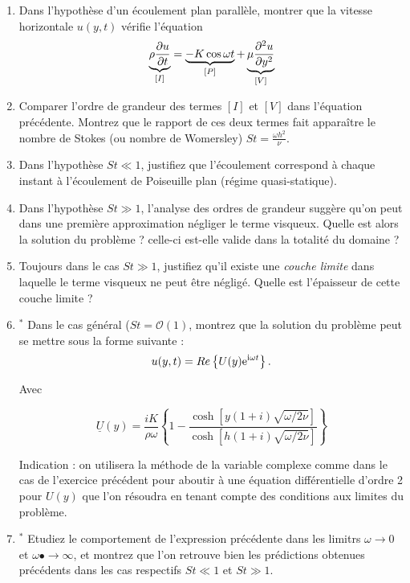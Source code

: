 \begin{enumerate}
\item 
Dans l'hypoth\`ese d'un \'ecoulement plan parall\`ele, montrer que
la vitesse horizontale $u(y, t)$ v\'erifie l'\'equation
\begin{equation}
\underbrace{\rho \frac {\partial u} {\partial t}}_{[I]} = \underbrace{- K \cos \omega t}_{[P]} + \underbrace{\mu \frac {\partial^{2} u} {\partial y ^{2}}}_{[V]}
\label{eq:ns}
\end{equation}

\item Comparer l'ordre de grandeur des termes $[I]$ et $[V]$ dans l'équation précédente. Montrez que le rapport de ces deux termes fait apparaître 
le nombre de Stokes (ou nombre de Womersley) $St = \frac{\omega h^2  }{\nu}$.

\item Dans l'hypothèse $St \ll 1$, justifiez que l'écoulement correspond à chaque instant à l'écoulement de Poiseuille plan   
(régime quasi-statique).

\item Dans l'hypothèse $St \gg 1$, l'analyse des ordres de grandeur suggère qu'on peut dans une première approximation
négliger le terme visqueux. Quelle est alors la solution du problème ? celle-ci est-elle valide dans la totalité du domaine ?

\item Toujours dans le cas  $St \gg 1$, justifiez qu'il existe une {\em couche limite} dans laquelle le terme visqueux ne peut être négligé. 
Quelle est l'épaisseur de cette couche limite ?

\item $^*$ Dans le cas général ($St = {\mathcal O}(1)$, montrez que la solution du problème peut se mettre sous la forme suivante :
$$u(y, t) = Re \left \{ U(y) \mathrm{e}^{\mathrm{i} \omega t} \right \}.$$

Avec 

\begin{equation}
\label{sol}
 \underline{U}(y) = \frac{iK}{\rho \omega} \left \{ 
1 - \frac{\cosh [ y ( 1+i) \sqrt{\omega / 2\nu} ]}{\cosh [ 
h ( 1+i) \sqrt{\omega / 2\nu} ]}
\right \}
\end{equation}

Indication : on utilisera la méthode de la variable complexe comme dans le cas de l'exercice précédent pour aboutir à une équation différentielle d'ordre 2 pour $U(y)$ que l'on résoudra en tenant compte des conditions aux limites du problème.

\item $^*$ Etudiez le comportement de l'expression précédente dans les limitrs  $\omega \rightarrow 0 $ et $\omega •\rightarrow \infty$, et montrez que l'on retrouve bien les prédictions obtenues précédents dans les cas respectifs $St \ll 1$ et $St \gg 1$.





\end{enumerate}
